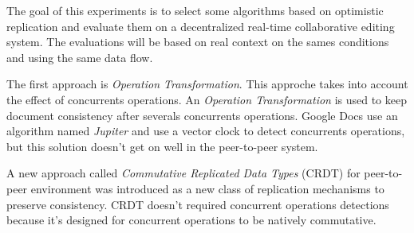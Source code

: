  The goal of this experiments is to select some algorithms based on optimistic replication and evaluate them on a decentralized real-time collaborative editing system. The evaluations will be based on real context on the sames conditions and using the same data flow.

The first approach is \emph{Operation Transformation}. This approche takes into account the effect of concurrents operations. An \emph{Operation Transformation} is used to keep document consistency after severals concurrents operations. Google Docs use an algorithm named \emph{Jupiter} and use a vector clock to detect concurrents operations, but this solution doesn’t get on well in the peer-to-peer system.

A new approach called \emph{Commutative Replicated Data Types} (CRDT) for peer-to-peer environment was introduced as a new class of replication mechanisms to preserve consistency. CRDT doesn't required concurrent operations detections because it's designed for concurrent operations to be natively commutative.